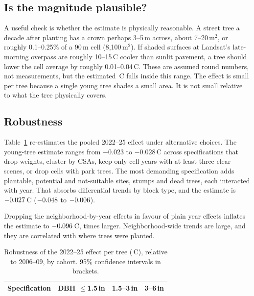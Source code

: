 \documentclass[11pt]{article}
\newcommand{\degC}{\,\textdegree C}
\begin{document}
\subsection{Is the magnitude plausible?}

A useful check is whether the estimate is physically reasonable. A street tree a decade after planting has a crown perhaps 3--5\,m across, about 7--20\,m$^2$, or roughly 0.1--0.25\% of a 90\,m cell (8,100\,m$^2$). If shaded surfaces at Landsat's late-morning overpass are roughly 10--15\degC{} cooler than sunlit pavement, a tree should lower the cell average by roughly 0.01--0.04\degC. These are assumed round numbers, not measurements, but the estimated \EstAabs\degC{} falls inside this range. The effect is small per tree because a single young tree shades a small area. It is not small relative to what the tree physically covers.

\subsection{Robustness}

Table~\ref{tab:robust} re-estimates the pooled 2022--25 effect under alternative choices. The young-tree estimate ranges from $-0.023$ to $-0.028$\degC{} across specifications that drop weights, cluster by \NCSA{} CSAs, keep only cell-years with at least three clear scenes, or drop cells with park trees. The most demanding specification adds plantable, potential and not-suitable sites, stumps and dead trees, each interacted with year. That absorbs differential trends by block type, and the estimate is $-0.027$\degC{} ($-0.048$ to $-0.006$).

Dropping the neighborhood-by-year effects in favour of plain year effects inflates the estimate to $-0.096$\degC{}, \YearFERatio{} times larger. Neighborhood-wide trends are large, and they are correlated with where trees were planted.

\begin{table}[t]\centering\small
\caption{Robustness of the 2022--25 effect per tree (\degC), relative to 2006--09, by cohort. 95\% confidence intervals in brackets.}\label{tab:robust}
\begin{tabularx}{\textwidth}{@{}Xccc@{}}\toprule
Specification & DBH $\le$1.5\,in & 1.5--3\,in & 3--6\,in \\\midrule

\bottomrule\end{tabularx}
\end{table}
\end{document}

